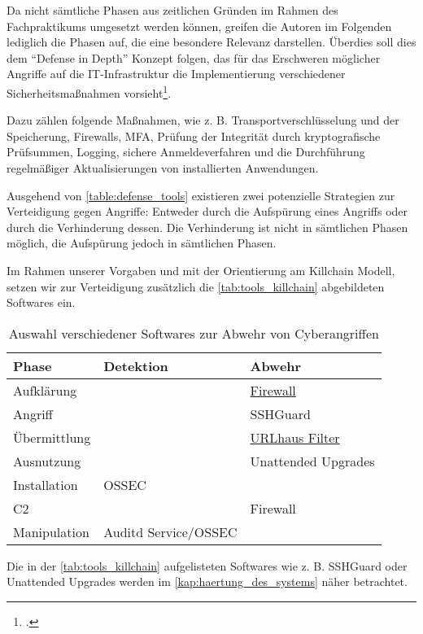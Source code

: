 Da nicht sämtliche Phasen aus zeitlichen Gründen im Rahmen des Fachpraktikums umgesetzt werden können, greifen die Autoren im Folgenden lediglich die Phasen auf, die eine besondere Relevanz darstellen. Überdies soll dies dem \enquote{Defense in Depth} Konzept folgen, das für das Erschweren möglicher Angriffe auf die IT-Infrastruktur die Implementierung verschiedener Sicherheitsmaßnahmen vorsieht\footcite[Vgl.][]{barbu2015defense}.

Dazu zählen folgende Maßnahmen, wie z. B. Transportverschlüsselung und der Speicherung, Firewalls, \ac{MFA}, Prüfung der Integrität durch kryptografische Prüfsummen, Logging, sichere Anmeldeverfahren und die Durchführung regelmäßiger Aktualisierungen von installierten Anwendungen.

Ausgehend von \autoref{table:defense_tools} existieren zwei potenzielle Strategien zur Verteidigung gegen Angriffe: Entweder durch die Aufspürung eines Angriffs oder durch die Verhinderung dessen. Die Verhinderung ist nicht in sämtlichen Phasen möglich, die Aufspürung jedoch in sämtlichen Phasen.

Im Rahmen unserer Vorgaben und mit der Orientierung am Killchain Modell, setzen wir zur Verteidigung zusätzlich die \autoref{tab:tools_killchain} abgebildeten Softwares ein.

\begin{table}[ht]
    \begin{center}
        \begin{tabular}{|l|l|l|}
            \hline
            Phase        & Detektion      & Abwehr        \\ \hline
            Aufklärung   &                & \href{https://feodotracker.abuse.ch/blocklist/}{Firewall}            \\ \hline
            Angriff      &                & SSHGuard            \\ \hline
            Übermittlung &                & \href{https://gitlab.com/malware-filter/urlhaus-filter}{URLhaus Filter}     \\ \hline
            Ausnutzung   &                & Unattended Upgrades \\ \hline
            Installation & OSSEC          &                     \\ \hline
            C2           &                & Firewall            \\ \hline
            Manipulation & Auditd Service/OSSEC &                     \\ \hline
        \end{tabular}
    \end{center}
    \caption{Auswahl verschiedener Softwares zur Abwehr von Cyberangriffen}
    \label{tab:tools_killchain}
\end{table}

Die in der \autoref{tab:tools_killchain} aufgelisteten Softwares wie z. B. SSHGuard oder Unattended Upgrades werden im \autoref{kap:haertung_des_systems} näher betrachtet.